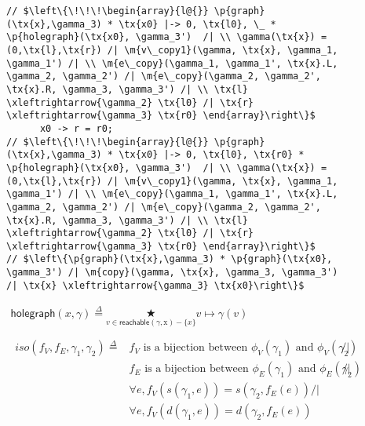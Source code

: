 \documentclass[acmsmall,review,anonymous]{acmart}\settopmatter{printfolios=true,printccs=false,printacmref=false}
\newcommand{\defeq}{\mathbin{\stackrel{\Delta}{=}}}
\newcommand{\tx}[1]{\text{#1}}
\newcommand{\p}[1]{\ensuremath{\mathsf{#1}}} \newcommand{\m}[1]{\ensuremath{\mathit{#1}}} \newcommand{\ma}[1]{\ensuremath{\mathcal{#1}}} \let\ramify\lightning
\begin{document}
\begin{figure}
  \begin{lstlisting}
// $\left\{\!\!\!\begin{array}{l@{}} \p{graph}(\tx{x},\gamma_3) * \tx{x0} |-> 0, \tx{l0}, \_ * \p{holegraph}(\tx{x0}, \gamma_3')  /| \\ \gamma(\tx{x}) = (0,\tx{l},\tx{r}) /| \m{v\_copy1}(\gamma, \tx{x}, \gamma_1, \gamma_1') /| \\ \m{e\_copy}(\gamma_1, \gamma_1', \tx{x}.L, \gamma_2, \gamma_2') /| \m{e\_copy}(\gamma_2, \gamma_2', \tx{x}.R, \gamma_3, \gamma_3') /| \\ \tx{l} \xleftrightarrow{\gamma_2} \tx{l0} /| \tx{r} \xleftrightarrow{\gamma_3} \tx{r0} \end{array}\right\}$
      x0 -> r = r0;
// $\left\{\!\!\!\begin{array}{l@{}} \p{graph}(\tx{x},\gamma_3) * \tx{x0} |-> 0, \tx{l0}, \tx{r0} * \p{holegraph}(\tx{x0}, \gamma_3')  /| \\ \gamma(\tx{x}) = (0,\tx{l},\tx{r}) /| \m{v\_copy1}(\gamma, \tx{x}, \gamma_1, \gamma_1') /| \\ \m{e\_copy}(\gamma_1, \gamma_1', \tx{x}.L, \gamma_2, \gamma_2') /| \m{e\_copy}(\gamma_2, \gamma_2', \tx{x}.R, \gamma_3, \gamma_3') /| \\ \tx{l} \xleftrightarrow{\gamma_2} \tx{l0} /| \tx{r} \xleftrightarrow{\gamma_3} \tx{r0} \end{array}\right\}$
// $\left\{\p{graph}(\tx{x},\gamma_3) * \p{graph}(\tx{x0}, \gamma_3') /| \m{copy}(\gamma, \tx{x}, \gamma_3, \gamma_3') /| \tx{x} \xleftrightarrow{\gamma_3} \tx{x0}\right\}$
  \end{lstlisting}
  \small
\begin{gather*}
  \p{holegraph}(x, \gamma)\defeq \underset{v\in\p{reachable}(\gamma, \tx x) - \{x\}}{\bigstar}v \mapsto \gamma(v)\\
\, \\
  \begin{split}
  \m{iso}(f_V, f_E, \gamma_1, \gamma_2) \defeq 
& f_V \text{ is a bijection between $\phi_V(\gamma_1)$ and $\phi_V(\gamma_2)$} /| \\
& f_E \text{ is a bijection between $\phi_E(\gamma_1)$ and $\phi_E(\gamma_2)$}  /| \\
& \forall e, f_V(s(\gamma_1, e)) = s(\gamma_2, f_E(e)) /| \\
& \forall e, f_V(d(\gamma_1, e)) = d(\gamma_2, f_E(e)) 
  \end{split} \\
  \begin{split}

\end{split}
\end{gather*}
\end{figure}
\end{document}
